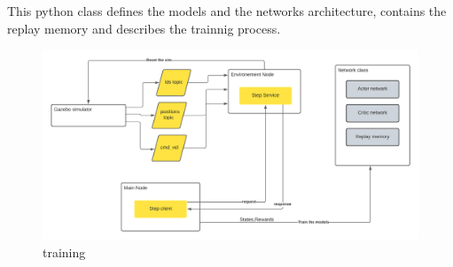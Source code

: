 \documentclass[12pt]{extarticle}
\begin{document}
This python class defines the models and the networks architecture, contains the replay memory and describes the trainnig process.  













 \begin{figure}[h]  
\centering
\includegraphics[scale=0.65]{training}
\caption[training phase]{training}
\end{figure}











 


\newpage


\end{document}
